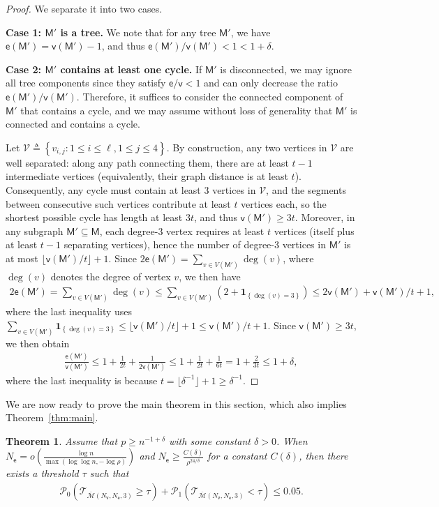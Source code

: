 \documentclass[letterpaper,11pt]{article}
\newtheorem{theorem}{Theorem}
\theoremstyle{definition}
\newcommand{\maM}{\mathcal{M}}
\newcommand{\maP}{\mathcal{P}}
\newcommand{\maT}{\mathcal{T}}
\newcommand{\maV}{\mathcal{V}}
\newcommand{\en}{\mathsf{{e}}}
\newcommand{\vn}{\mathsf{{v}}}
\newcommand{\pth}[1]{\left( #1 \right)}
\newcommand{\sth}[1]{\left\{ #1 \right\}}
\newcommand{\sfM}{{\mathsf{M}}}
\newcommand{\sfe}{{\mathsf{e}}}
\newcommand{\sfv}{{\mathsf{v}}}
\newcommand{\indc}[1]{{\mathbf{1}_{\left\{{#1}\right\}}}}
\begin{document}
\begin{proof}
    We separate it into two cases.

    \textbf{Case 1: $\sfM'$ is a tree.} We note that for any tree $\sfM'$, we have $\en(\sfM') = \vn(\sfM')-1$, and thus $\en(\sfM')/\vn(\sfM')<1<1+\delta$.

    \textbf{Case 2: $\sfM'$ contains at least one cycle.}
    If $\sfM'$ is disconnected, we may ignore all tree components since they satisfy $\en/\vn<1$ and can only decrease the ratio $\en(\sfM')/\vn(\sfM')$.
    Therefore, it suffices to consider the connected component of $\sfM'$ that contains a cycle, and we may assume without loss of generality that $\sfM'$ is connected and contains a cycle.  
    
    Let $\maV\triangleq \sth{v_{i,j}:1\le i\le \ell,1\le j\le 4}$.
    By construction, any two  vertices in $\maV$ are well separated: along any path connecting them, there are at least $t-1$ intermediate vertices (equivalently, their graph distance is at least $t$). Consequently, any cycle must contain at least 3 vertices in $\maV$, and the segments between consecutive such vertices contribute at least $t$ vertices each, so the shortest possible cycle has length at least $3t$, and thus $\vn(\sfM')\ge 3t$. Moreover, in any subgraph $\sfM'\subseteq \sfM$, each degree-$3$ vertex requires at least $t$ vertices (itself plus at least $t-1$ separating vertices), hence the number of degree-$3$ vertices in $\sfM'$ is at most $\lfloor \vn(\sfM')/t\rfloor+1$. Since $2\en(\sfM') = \sum_{v\in V(\sfM')}\operatorname{deg}(v)$, where $\operatorname{deg}(v)$ denotes the degree of vertex $v$, we then have \begin{align*}
        2\en(\sfM') = \sum_{v\in V(\sfM')}\operatorname{deg}(v)\le  \sum_{v\in V(\sfM')}(2+\indc{\operatorname{deg}(v)=3})\le 2\vn(\sfM')+\vn(\sfM')/t+1, 
    \end{align*}
    where the last inequality uses $\sum_{v\in V(\sfM')}\indc{\operatorname{deg}(v)=3}\le \lfloor \vn(\sfM')/t\rfloor+1\le  \vn(\sfM')/t+1$. Since $\vn(\sfM')\ge 3t$, we then obtain \begin{align*}
        \frac{\en(\sfM')}{\vn(\sfM')}\le 1+\frac{1}{2t}+\frac{1}{2\vn(\sfM')}\le 1+\frac{1}{2t}+\frac{1}{6t} = 1+\frac{2}{3t}\le 1+\delta,
    \end{align*}
    where the last inequality is because $t = \lfloor \delta^{-1}\rfloor+1\ge \delta^{-1}$.
\end{proof}
We are now ready to prove the main theorem in this section, which also implies Theorem~\ref{thm:main}.
\begin{theorem}\label{thm:refined-main-thm}
    Assume that $p\ge n^{-1+\delta}$ with some constant $\delta>0$. When $N_\sfe = o\pth{\frac{\log n}{\max(\log\log n,-\log \rho)}}$ and $N_\sfe \ge \frac{C(\delta)}{\rho^{24/\delta}}$ for a constant $C(\delta)$, then there exists a threshold $\tau$ such that 
    \begin{align*}
        \maP_0(\maT_{\overline{\maM}(N_\sfv,N_\sfe,3)}\ge \tau)+\maP_1(\maT_{\overline{\maM}(N_\sfv,N_\sfe,3)}< \tau)\le 0.05.
    \end{align*}
\end{theorem}
\end{document}
